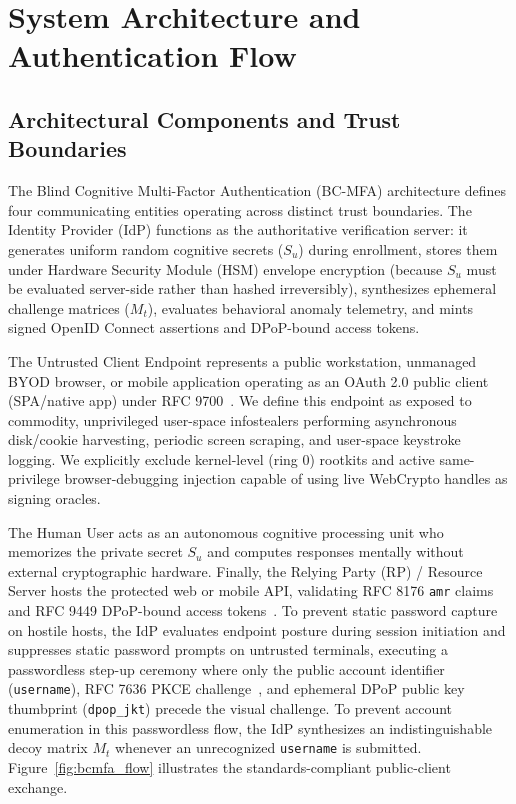 \section{System Architecture and Authentication Flow}
\label{sec:architecture}

\subsection{Architectural Components and Trust Boundaries}
The Blind Cognitive Multi-Factor Authentication (BC-MFA) architecture defines four communicating entities operating across distinct trust boundaries. The Identity Provider (IdP) functions as the authoritative verification server: it generates uniform random cognitive secrets ($S_u$) during enrollment, stores them under Hardware Security Module (HSM) envelope encryption (because $S_u$ must be evaluated server-side rather than hashed irreversibly), synthesizes ephemeral challenge matrices ($M_t$), evaluates behavioral anomaly telemetry, and mints signed OpenID Connect assertions and DPoP-bound access tokens.

The Untrusted Client Endpoint represents a public workstation, unmanaged BYOD browser, or mobile application operating as an OAuth 2.0 public client (SPA/native app) under RFC 9700~\cite{rfc9700bcp}. We define this endpoint as exposed to commodity, unprivileged user-space infostealers performing asynchronous disk/cookie harvesting, periodic screen scraping, and user-space keystroke logging. We explicitly exclude kernel-level (ring 0) rootkits and active same-privilege browser-debugging injection capable of using live WebCrypto handles as signing oracles.

The Human User acts as an autonomous cognitive processing unit who memorizes the private secret $S_u$ and computes responses mentally without external cryptographic hardware. Finally, the Relying Party (RP) / Resource Server hosts the protected web or mobile API, validating RFC 8176 \texttt{amr} claims and RFC 9449 DPoP-bound access tokens~\cite{rfc8176amr, rfc9449dpop}. To prevent static password capture on hostile hosts, the IdP evaluates endpoint posture during session initiation and suppresses static password prompts on untrusted terminals, executing a passwordless step-up ceremony where only the public account identifier (\texttt{username}), RFC 7636 PKCE challenge~\cite{rfc7636pkce}, and ephemeral DPoP public key thumbprint (\texttt{dpop\_jkt}) precede the visual challenge. To prevent account enumeration in this passwordless flow, the IdP synthesizes an indistinguishable decoy matrix $M_t$ whenever an unrecognized \texttt{username} is submitted. Figure~\ref{fig:bcmfa_flow} illustrates the standards-compliant public-client exchange.

